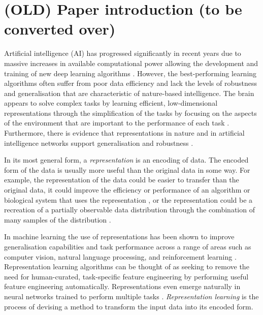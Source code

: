 \chapter{(OLD) Paper introduction (to be converted over)}

Artificial intelligence (AI) has progressed significantly in recent years due to massive increases in available computational power allowing the development and training of new deep learning algorithms \autocite{Amodei2018,thompson2020computational}.
However, the best-performing learning algorithms often suffer from poor data efficiency and lack the levels of robustness and generalisation that are characteristic of nature-based intelligence.
The brain appears to solve complex tasks by learning efficient, low-dimensional representations through the simplification of the tasks by focusing on the aspects of the environment that are important to the performance of each task \autocite{Niv2019,mack2020ventromedial,jha2023extracting,op2001inferotemporal,shepard1987toward,edelman1997learning}.
Furthermore, there is evidence that representations in nature and in artificial intelligence networks support generalisation and robustness \autocite{flesch2022orthogonal, Bernardi2020,ito2022compositional,momennejad2020learning,lehnert2020reward,alonso2013associative,kokkola2019double}.

In its most general form, a \textit{representation} is an encoding of data.
The encoded form of the data is usually more useful than the original data in some way.
For example, the representation of the data could be easier to transfer than the original data, it could improve the efficiency or performance of an algorithm or biological system that uses the representation \autocite{Lesort2018StateRL, Bengio2013}, or the representation could be a recreation of a partially observable data distribution through the combination of many samples of the distribution \autocite{Boutilier1996, Zhang2019}.

In machine learning the use of representations has been shown to improve generalisation capabilities and task performance across a range of areas such as computer vision, natural language processing, and reinforcement learning \autocite{Bengio2013,botteghi2022unsupervised,mohamed2022self,voulodimos2018deep}.
Representation learning algorithms can be thought of as seeking to remove the need for human-curated, task-specific feature engineering by performing useful feature engineering automatically.
Representations even emerge naturally in neural networks trained to perform multiple tasks \autocite{Johnston2023}.
\textit{Representation learning} is the process of devising a method to transform the input data into its encoded form.

